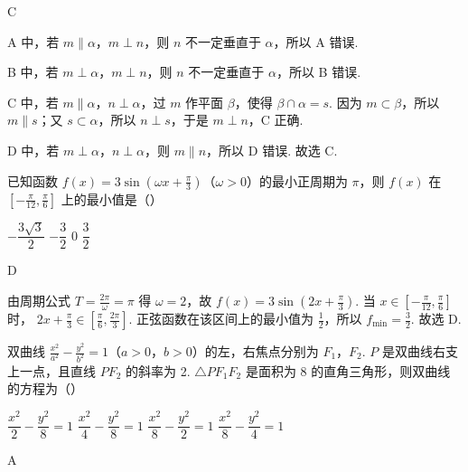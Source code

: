 \begin{answer}
C
\end{answer}

\begin{solution}
A 中，若 \(m\parallel \alpha\)，\(m\perp n\)，则 \(n\) 不一定垂直于 \(\alpha\)，所以 A 错误.

B 中，若 \(m\perp \alpha\)，\(m\perp n\)，则 \(n\) 不一定垂直于 \(\alpha\)，所以 B 错误.

C 中，若 \(m\parallel \alpha\)，\(n\perp \alpha\)，过 \(m\) 作平面 \(\beta\)，使得 \(\beta\cap \alpha=s\). 因为 \(m\subset \beta\)，所以 \(m\parallel s\)；又 \(s\subset \alpha\)，所以 \(n\perp s\)，于是 \(m\perp n\)，C 正确.

D 中，若 \(m\perp \alpha\)，\(n\perp \alpha\)，则 \(m\parallel n\)，所以 D 错误.
故选 C.
\end{solution}

\begin{problem}
已知函数 \(f(x)=3\sin \left( \omega x+\frac{\pi}{3} \right)\)（\(\omega>0\)）的最小正周期为 \(\pi\)，则 \(f(x)\) 在 \(\left[-\frac{\pi}{12},\frac{\pi}{6}\right]\) 上的最小值是（\quad）

\choices
    {\(-\dfrac{3\sqrt3}{2}\)}
    {\(-\dfrac32\)}
    {0}
    {\(\dfrac32\)}
\end{problem}

\begin{answer}
D
\end{answer}

\begin{solution}
由周期公式
\(T=\frac{2\pi}{\omega}=\pi\)
得
\(\omega=2\)，故
\(f(x)=3\sin\left(2x+\frac{\pi}{3}\right)\).
当 \(x\in\left[-\frac{\pi}{12},\frac{\pi}{6}\right]\) 时，
\(2x+\frac{\pi}{3}\in\left[\frac{\pi}{6},\frac{2\pi}{3}\right]\).
正弦函数在该区间上的最小值为 \(\frac12\)，所以
\(f_{\min}=\frac32\). 故选 D.
\end{solution}

\begin{problem}
双曲线 \(\frac{x^2}{a^2}-\frac{y^2}{b^2}=1\)（\(a>0\)，\(b>0\)）的左，右焦点分别为 \(F_1\)，\(F_2\). \(P\) 是双曲线右支上一点，且直线 \(PF_2\) 的斜率为 2. \(\triangle PF_1F_2\) 是面积为 8 的直角三角形，则双曲线的方程为（\quad）

\choices
    {\(\dfrac{x^2}{2}-\dfrac{y^2}{8}=1\)}
    {\(\dfrac{x^2}{4}-\dfrac{y^2}{8}=1\)}
    {\(\dfrac{x^2}{8}-\dfrac{y^2}{2}=1\)}
    {\(\dfrac{x^2}{8}-\dfrac{y^2}{4}=1\)}
\end{problem}

\begin{answer}
A
\end{answer}

